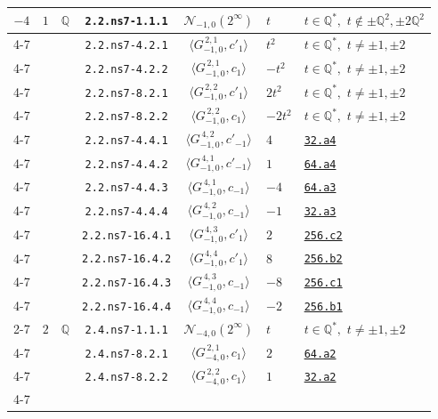 \documentclass[11pt]{amsart}
\newcommand{\eclabel}[1]{\href{https://www.lmfdb.org/EllipticCurve/Q/#1}{\texttt{#1}}}
\theoremstyle{definition}
\newcommand{\Q}{\mathbb Q}
\newcommand{\QQ}{\mathbb Q}
\begin{document}
{\begin{longtable}{|c|c|c|c|c|l|l|}
{$-4$} & {$1$}  & {$\QQ$} &  \texttt{2.2.ns7-1.1.1} & $\mathcal N_{-1,0}(2^{\infty})$ &   $t$ &  $t\in \Q^*,\,\,t\not \in \pm\Q^2,\pm 2 \Q^2$\\  \cline{4-7}  
 & & & \texttt{2.2.ns7-4.2.1} & $\langle G^{\, 2,1}_{-1,0},c'_{1}\rangle$ &   $t^2$  &$t\in \Q^*, \,\,t\ne \pm 1,\pm 2$
\\ \cline{4-7} 
 & & & \texttt{2.2.ns7-4.2.2} & $\langle G^{\, 2,1}_{-1,0},c_{1}\rangle$  &  $-t^2$ & $t\in \Q^*, \,\,t\ne \pm 1,\pm 2$ \\ \cline{4-7} 
 & &  & \texttt{2.2.ns7-8.2.1} & $\langle G^{\, 2,2}_{-1,0},c'_{1}\rangle$ &  $2t^2$ &  $t\in \Q^*, \,\,t\ne \pm 1,\pm 2$\\ \cline{4-7}  
 & & & \texttt{2.2.ns7-8.2.2} & $\langle G^{\, 2,2}_{-1,0},c_{1}\rangle$ &  $-2t^2$ &  $t\in \Q^*, \,\,t\ne \pm 1,\pm 2$ \\  \cline{4-7}   
 & & & \texttt{2.2.ns7-4.4.1} & $\langle G^{\, 4,2}_{-1,0},c'_{-1}\rangle$ &   $4$ &  \eclabel{32.a4} \\  \cline{4-7}   
 & & & \texttt{2.2.ns7-4.4.2} & $\langle G^{\, 4,1}_{-1,0},c'_{-1}\rangle$ &   $1$ &  \eclabel{64.a4} \\  \cline{4-7}   
 & & & \texttt{2.2.ns7-4.4.3} & $\langle G^{\, 4,1}_{-1,0},c_{-1}\rangle$ &   $-4$ &  \eclabel{64.a3} \\  \cline{4-7}   
 & & & \texttt{2.2.ns7-4.4.4} & $\langle G^{\, 4,2}_{-1,0},c_{-1}\rangle$ &   $-1$ &  \eclabel{32.a3} \\  \cline{4-7}   
 & & & \texttt{2.2.ns7-16.4.1} & $\langle G^{\, 4,3}_{-1,0},c'_{1}\rangle$ &  $2$ &  \eclabel{256.c2}  \\  \cline{4-7}   
 & & & \texttt{2.2.ns7-16.4.2} & $\langle G^{\, 4,4}_{-1,0},c'_{1}\rangle$ &  $8$ &  \eclabel{256.b2} \\  \cline{4-7}   
 & & & \texttt{2.2.ns7-16.4.3} & $\langle G^{\, 4,3}_{-1,0},c_{-1}\rangle$ &   $-8$ &  \eclabel{256.c1} \\  \cline{4-7}   
 & & & \texttt{2.2.ns7-16.4.4} & $\langle G^{\, 4,4}_{-1,0},c_{-1}\rangle$ &   $-2$ &  \eclabel{256.b1} \\    \cline{2-7}
    &   {$2$} &  {$\QQ$} & \texttt{2.4.ns7-1.1.1} & $\mathcal N_{-4,0}(2^{\infty})$ &   $t$  &  $t\in \Q^*,\,\, t\ne \pm 1,\pm 2$ \\  \cline{4-7} 
 & & & \texttt{2.4.ns7-8.2.1} & $\langle G^{\, 2,1}_{-4,0},c_{1}\rangle$ &   $2$  &  \eclabel{64.a2} \\ \cline{4-7}   
 & & & \texttt{2.4.ns7-8.2.2} & $\langle G^{\, 2,2}_{-4,0},c_{1}\rangle$ &   $1$ &  \eclabel{32.a2}  \\ \cline{4-7}   

\end{longtable}}
\end{document}
